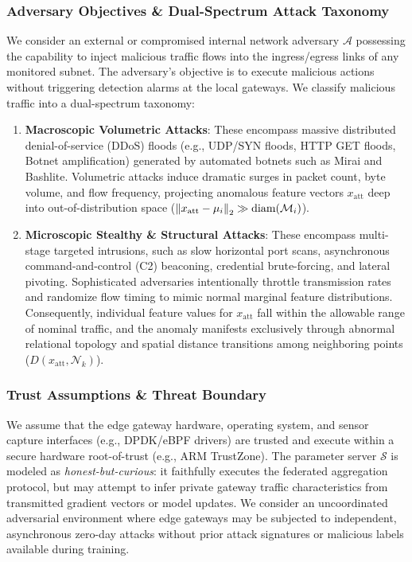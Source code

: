 \subsubsection{Adversary Objectives \& Dual-Spectrum Attack Taxonomy}
We consider an external or compromised internal network adversary $\mathcal{A}$ possessing the capability to inject malicious traffic flows into the ingress/egress links of any monitored subnet. The adversary's objective is to execute malicious actions without triggering detection alarms at the local gateways. We classify malicious traffic into a dual-spectrum taxonomy:
\begin{enumerate}
    \item \textbf{Macroscopic Volumetric Attacks}: These encompass massive distributed denial-of-service (DDoS) floods (e.g., UDP/SYN floods, HTTP GET floods, Botnet amplification) generated by automated botnets such as Mirai and Bashlite. Volumetric attacks induce dramatic surges in packet count, byte volume, and flow frequency, projecting anomalous feature vectors $x_{\text{att}}$ deep into out-of-distribution space ($\left\lVert x_{\text{att}} - \mu_i\right\rVert_2 \gg \text{diam}(\mathcal{M}_i)$).
    \item \textbf{Microscopic Stealthy \& Structural Attacks}: These encompass multi-stage targeted intrusions, such as slow horizontal port scans, asynchronous command-and-control (C2) beaconing, credential brute-forcing, and lateral pivoting. Sophisticated adversaries intentionally throttle transmission rates and randomize flow timing to mimic normal marginal feature distributions. Consequently, individual feature values for $x_{\text{att}}$ fall within the allowable range of nominal traffic, and the anomaly manifests exclusively through abnormal relational topology and spatial distance transitions among neighboring points ($D(x_{\text{att}}, \mathcal{N}_k)$).
\end{enumerate}

\subsubsection{Trust Assumptions \& Threat Boundary}
We assume that the edge gateway hardware, operating system, and sensor capture interfaces (e.g., DPDK/eBPF drivers) are trusted and execute within a secure hardware root-of-trust (e.g., ARM TrustZone). The parameter server $\mathcal{S}$ is modeled as \emph{honest-but-curious}: it faithfully executes the federated aggregation protocol, but may attempt to infer private gateway traffic characteristics from transmitted gradient vectors or model updates. We consider an uncoordinated adversarial environment where edge gateways may be subjected to independent, asynchronous zero-day attacks without prior attack signatures or malicious labels available during training.

